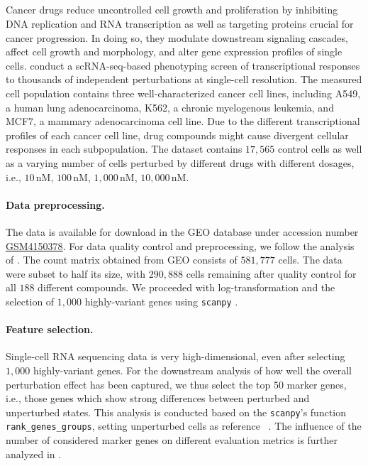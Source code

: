\subsection{\citet{srivatsan2020massively}}
\label{app:dataset_srivatsan}

 Cancer drugs reduce uncontrolled cell growth and proliferation by inhibiting DNA replication and RNA transcription as well as targeting proteins crucial for cancer progression. In doing so, they modulate downstream signaling cascades, affect cell growth and morphology, and alter gene expression profiles of single cells. 
\citet{srivatsan2020massively} conduct a scRNA-seq-based phenotyping screen of transcriptional responses to thousands of independent perturbations at single-cell resolution.
The measured cell population contains three well-characterized cancer cell lines, including A549, a human lung adenocarcinoma, K562, a chronic myelogenous leukemia, and MCF7, a mammary adenocarcinoma cell line.
Due to the different transcriptional profiles of each cancer cell line, drug compounds might cause divergent cellular responses in each subpopulation.
The dataset contains $17,565$ control cells as well as a varying number of cells perturbed by different drugs with different dosages, i.e., $10\,$nM, $100\,$nM, $1,000\,$nM, $10,000\,$nM.

\paragraph{Data preprocessing.}
The data is available for download in the \acrfull{GEO} database under accession number \href{https://www.ncbi.nlm.nih.gov/geo/query/acc.cgi?acc=GSM4150378}{GSM4150378}.
For data quality control and preprocessing, we follow the analysis of \citet{lotfollahi2021compositional}. The count matrix obtained from GEO consists of $581,777$ cells. The data were subset to half its size, with $290,888$ cells remaining after quality control for all $188$ different compounds. We proceeded with log-transformation and the selection of $1,000$ highly-variant genes using \texttt{scanpy} \citep{wolf2018scanpy}.

\paragraph{Feature selection.}
Single-cell RNA sequencing data is very high-dimensional, even after selecting $1,000$ highly-variant genes.
For the downstream analysis of how well the overall perturbation effect has been captured, we thus select the top $50$ marker genes, i.e., those genes which show strong differences between perturbed and unperturbed states. This analysis is conducted based on the \texttt{scanpy}'s function \texttt{rank\_genes\_groups}, setting unperturbed cells as reference ~\citep{wolf2018scanpy}. The influence of the number of considered marker genes on different evaluation metrics is further analyzed in \citet{bunne2021learning}.

